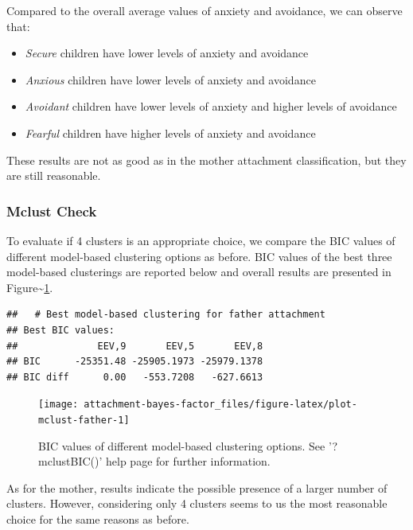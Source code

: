 \documentclass[
]{book}
\providecommand{\tightlist}{%
  \setlength{\itemsep}{0pt}\setlength{\parskip}{0pt}}
\begin{document}
Compared to the overall average values of anxiety and avoidance, we can observe that:

\begin{itemize}
\tightlist
\item
  \emph{Secure} children have lower levels of anxiety and avoidance
\item
  \emph{Anxious} children have lower levels of anxiety and avoidance
\item
  \emph{Avoidant} children have lower levels of anxiety and higher levels of avoidance
\item
  \emph{Fearful} children have higher levels of anxiety and avoidance
\end{itemize}

These results are not as good as in the mother attachment classification, but they are still reasonable.

\hypertarget{mclust-check-1}{%
\subsubsection*{Mclust Check}\label{mclust-check-1}}

To evaluate if 4 clusters is an appropriate choice, we compare the BIC values of different model-based clustering options as before. BIC values of the best three model-based clusterings are reported below and overall results are presented in Figure\textasciitilde\ref{fig:plot-mclust-father}.

\begin{verbatim}
##   # Best model-based clustering for father attachment
## Best BIC values:
##              EEV,9       EEV,5       EEV,8
## BIC      -25351.48 -25905.1973 -25979.1378
## BIC diff      0.00   -553.7208   -627.6613
\end{verbatim}

\begin{figure}

{\centering \texttt{[image: attachment-bayes-factor\_files/figure-latex/plot-mclust-father-1]} 

}

\caption{BIC values of different model-based clustering options. See '?mclustBIC()' help page for further information.}\label{fig:plot-mclust-father}
\end{figure}

As for the mother, results indicate the possible presence of a larger number of clusters. However, considering only 4 clusters seems to us the most reasonable choice for the same reasons as before.
\end{document}
